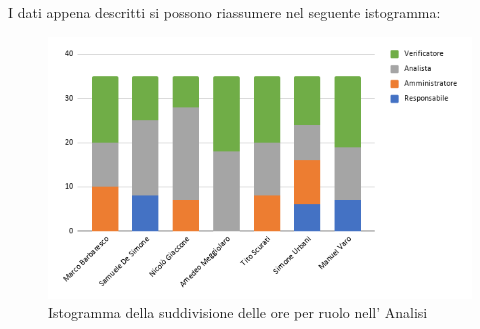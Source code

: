 \pagebreak
I dati appena descritti si possono riassumere nel seguente istogramma:
\begin{figure}[!h]
    \vspace{5px}
    \includegraphics[scale=0.6]{../../../Images/Diagrammi/Istogrammi/ore analisi.png}
    \centering
    \caption{Istogramma della suddivisione delle ore per ruolo nell' Analisi}
\end{figure}
